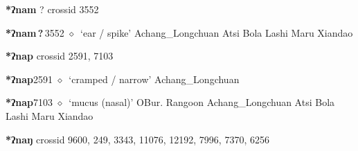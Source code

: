 \textbf{*ʔnam}
?
  {\tiny crossid 3552}
  \begin{list}{}{\leftmargin=1.5em \itemindent=-1.5em}
  \item {\footnotesize \textbf{*ʔnam\,?\,}}{\tiny 3552}
         $\diamond$~`ear / spike'
         Achang\_Longchuan 
\hspace{1ex}
         Atsi 
\hspace{1ex}
         Bola 
\hspace{1ex}
         Lashi 
\hspace{1ex}
         Maru 
\hspace{1ex}
         Xiandao 
  \end{list}
\item
\textbf{*ʔnap}
  {\tiny crossid 2591, 7103}
  \begin{list}{}{\leftmargin=1.5em \itemindent=-1.5em}
  \item {\footnotesize \textbf{*ʔnap}}{\tiny 2591}
         $\diamond$~`cramped / narrow'
         Achang\_Longchuan 
  \item {\footnotesize \textbf{*ʔnap}}{\tiny 7103}
\hspace{1ex}
         $\diamond$~`mucus (nasal)'
         OBur. 
\hspace{1ex}
         Rangoon 
\hspace{1ex}
         Achang\_Longchuan 
\hspace{1ex}
         Atsi 
\hspace{1ex}
         Bola 
\hspace{1ex}
         Lashi 
\hspace{1ex}
         Maru 
\hspace{1ex}
         Xiandao 
  \end{list}
\item
\textbf{*ʔnaŋ}
  {\tiny crossid 9600, 249, 3343, 11076, 12192, 7996, 7370, 6256}
